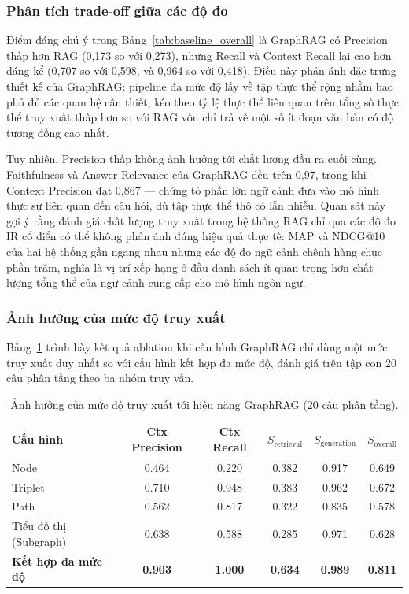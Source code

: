 \subsubsection{Phân tích trade-off giữa các độ đo}
\label{sec:tradeoff}

Điểm đáng chú ý trong Bảng~\ref{tab:baseline_overall} là GraphRAG có Precision thấp hơn RAG (0,173 so với 0,273), nhưng Recall và Context Recall lại cao hơn đáng kể (0,707 so với 0,598, và 0,964 so với 0,418). Điều này phản ánh đặc trưng thiết kế của GraphRAG: pipeline đa mức độ lấy về tập thực thể rộng nhằm bao phủ đủ các quan hệ cần thiết, kéo theo tỷ lệ thực thể liên quan trên tổng số thực thể truy xuất thấp hơn so với RAG vốn chỉ trả về một số ít đoạn văn bản có độ tương đồng cao nhất.

Tuy nhiên, Precision thấp không ảnh hưởng tới chất lượng đầu ra cuối cùng. Faithfulness và Answer Relevance của GraphRAG đều trên 0,97, trong khi Context Precision đạt 0,867 --- chứng tỏ phần lớn ngữ cảnh đưa vào mô hình thực sự liên quan đến câu hỏi, dù tập thực thể thô có lẫn nhiễu. Quan sát này gợi ý rằng đánh giá chất lượng truy xuất trong hệ thống RAG chỉ qua các độ đo IR cổ điển có thể không phản ánh đúng hiệu quả thực tế: MAP và NDCG@10 của hai hệ thống gần ngang nhau nhưng các độ đo ngữ cảnh chênh hàng chục phần trăm, nghĩa là vị trí xếp hạng ở đầu danh sách ít quan trọng hơn chất lượng tổng thể của ngữ cảnh cung cấp cho mô hình ngôn ngữ.

\subsubsection{Ảnh hưởng của mức độ truy xuất}
\label{sec:granularity_ablation}

Bảng~\ref{tab:granularity_results} trình bày kết quả ablation khi cấu hình GraphRAG chỉ dùng một mức truy xuất duy nhất so với cấu hình kết hợp đa mức độ, đánh giá trên tập con 20 câu phân tầng theo ba nhóm truy vấn.

\begin{table}[h]
\centering
\caption{Ảnh hưởng của mức độ truy xuất tới hiệu năng GraphRAG (20 câu phân tầng).}
\label{tab:granularity_results}
\begin{tabular}{lccccc}
\hline
\textbf{Cấu hình} & \textbf{Ctx Precision} & \textbf{Ctx Recall} & \textbf{$S_{\text{retrieval}}$} & \textbf{$S_{\text{generation}}$} & \textbf{$S_{\text{overall}}$} \\
\hline
Node                       & 0.464 & 0.220 & 0.382 & 0.917 & 0.649 \\
Triplet                    & 0.710 & 0.948 & 0.383 & 0.962 & 0.672 \\
Path                       & 0.562 & 0.817 & 0.322 & 0.835 & 0.578 \\
Tiểu đồ thị (Subgraph)     & 0.638 & 0.588 & 0.285 & 0.971 & 0.628 \\
\textbf{Kết hợp đa mức độ} & \textbf{0.903} & \textbf{1.000} & \textbf{0.634} & \textbf{0.989} & \textbf{0.811} \\
\hline
\end{tabular}
\end{table}

